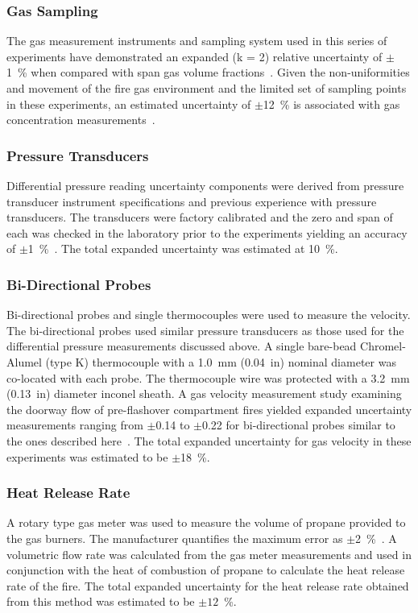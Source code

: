 \documentclass[12pt,oneside]{book}
\begin{document}
\subsubsection{Gas Sampling}
The gas measurement instruments and sampling system used in this series of experiments have demonstrated an expanded (k = 2) relative uncertainty of $\pm$1~\% when compared with span gas volume fractions~\cite{Bundy:2007}. Given the non-uniformities and movement of the fire gas environment and the limited set of sampling points in these experiments, an estimated uncertainty of $\pm$12~\% is associated with gas concentration measurements~\cite{Lock:1}.

\subsubsection{Pressure Transducers}
Differential pressure reading uncertainty components were derived from pressure transducer instrument specifications and previous experience with pressure transducers. The transducers were factory calibrated and the zero and span of each was checked in the laboratory prior to the experiments yielding an accuracy of $\pm$1~\%~\cite{Setra:2002}. The total expanded uncertainty was estimated at 10~\%.

\subsubsection{Bi-Directional Probes}
Bi-directional probes and single thermocouples were used to measure the velocity. The bi-directional probes used similar pressure transducers as those used for the differential pressure measurements discussed above. A single bare-bead Chromel-Alumel (type K) thermocouple with a 1.0~mm (0.04~in) nominal diameter was co-located with each probe. The thermocouple wire was protected with a 3.2~mm (0.13~in) diameter inconel sheath. A gas velocity measurement study examining the doorway flow of pre-flashover compartment fires yielded expanded uncertainty measurements ranging from $\pm$0.14 to $\pm$0.22 for bi-directional probes similar to the ones described here~\cite{Bryant:FSJ2009}. The total expanded uncertainty for gas velocity in these experiments was estimated to be $\pm$18~\%.

\subsubsection{Heat Release Rate}
A rotary type gas meter was used to measure the volume of propane provided to the gas burners. The manufacturer quantifies the maximum error as $\pm$2~\%~\cite{Romet:2014}. A volumetric flow rate was calculated from the gas meter measurements and used in conjunction with the heat of combustion of propane to calculate the heat release rate of the fire. The total expanded uncertainty for the heat release rate obtained from this method was estimated to be $\pm12$~\%.
\end{document}
